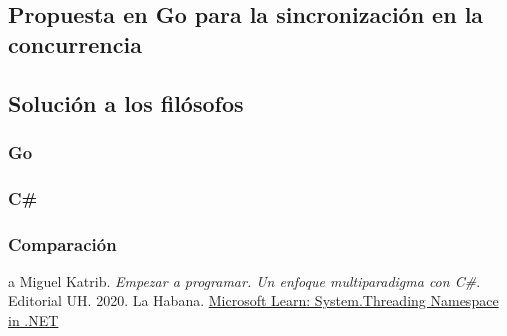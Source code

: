 \documentclass[10pt]{article} %
\begin{document}
\subsection{Propuesta en Go para la sincronización en la concurrencia}

\subsection{Solución a los filósofos}

\subsubsection{Go}

\subsubsection{C\#}

\subsubsection{Comparaci\'on}

\begin{thebibliography}
	a
	 Miguel Katrib. \emph{Empezar a programar. Un enfoque multiparadigma con C\#}. 
	Editorial UH.
	2020.
	La Habana.
	 \href{https://learn.microsoft.com/en-us/dotnet/api/system.threading?view=net-7.0}{Microsoft Learn: System.Threading Namespace in .NET}
\end{thebibliography}
\end{document}
